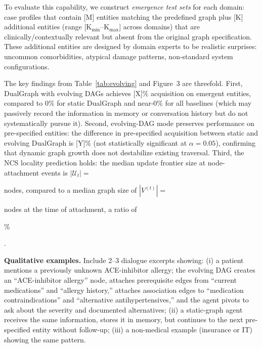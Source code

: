 \documentclass[11pt,a4paper]{article}
\newcommand{\placeholder}[1]{%
  \begin{tcolorbox}[colback=yellow!10,colframe=orange!60!black,
    fonttitle=\bfseries,title=Placeholder]
    #1
  \end{tcolorbox}%
}
\begin{document}
To evaluate this capability, we construct \emph{emergence test sets} for each
domain: case profiles that contain [M] entities matching the predefined graph
plus [K] additional entities (range [K$_{\min}$--K$_{\max}$] across domains)
that are clinically/contextually relevant but absent from the original graph
specification. These additional entities are designed by domain experts to be
realistic surprises: uncommon comorbidities, atypical damage patterns,
non-standard system configurations.

\begin{table}[!htbp]
\centering
\caption{Performance on emergence test sets. ``Pre-specified Acq.'' measures
acquisition of entities in the original graph $V$. ``Emergent Acq.'' measures
acquisition of entities absent from $V$ but present in the ground-truth
profile. Only DualGraph with evolving DAGs can represent and pursue emergent
entities; all other methods can at best note them passively in memory.}
\label{tab:evolving}
\small

\end{table}

The key findings from Table~\ref{tab:evolving} and Figure~3 are threefold.
First, DualGraph with evolving DAGs achieves [X]\% acquisition on emergent
entities, compared to 0\% for static DualGraph and near-0\% for all
baselines (which may passively record the information in memory or
conversation history but do not systematically pursue it). Second,
evolving-DAG mode preserves performance on pre-specified entities: the
difference in pre-specified acquisition between static and evolving DualGraph
is [Y]\% (not statistically significant at $\alpha = 0.05$), confirming that
dynamic graph growth does not destabilize existing traversal. Third, the NCS
locality prediction holds: the median update frontier size at node-attachment
events is $|\mathcal{U}_t| = $ \placeholder{[value]} nodes, compared to a
median graph size of $|V^{(t)}| = $ \placeholder{[value]} nodes at the time
of attachment, a ratio of \placeholder{[Z]\%}.

\placeholder{%
  \textbf{Qualitative examples.} Include 2--3 dialogue excerpts showing:
  (i) a patient mentions a previously unknown ACE-inhibitor allergy; the
  evolving DAG creates an ``ACE-inhibitor allergy'' node, attaches
  prerequisite edges from ``current medications'' and ``allergy history,''
  attaches association edges to ``medication contraindications'' and
  ``alternative antihypertensives,'' and the agent pivots to ask about
  the severity and documented alternatives;
  (ii) a static-graph agent receives the same information, stores it in
  memory, but continues to the next pre-specified entity without follow-up;
  (iii) a non-medical example (insurance or IT) showing the same pattern.
}
\end{document}
